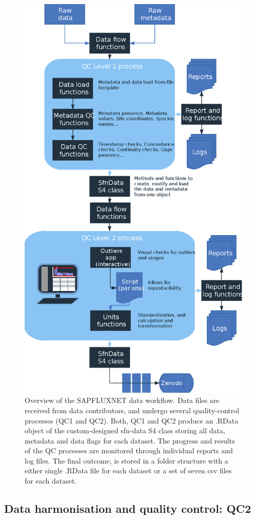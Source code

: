 \documentclass[11pt,twoside]{reedthesis}
\begin{document}
\setlength{\abovecaptionskip}{0pt}
\begin{figure}[H]

{\centering \includegraphics[width=0.7\linewidth]{figure/CH3/Figure1} 

}

\caption[Overview of the SAPFLUXNET data workflow.]{Overview of the SAPFLUXNET data workflow. Data files are received from data contributors, and undergo several quality-control processes (QC1 and QC2). Both, QC1 and QC2 produce an .RData object of the custom-designed sfn-data S4 class storing all data, metadata and data flags for each dataset. The progress and results of the QC processes are monitored through individual reports and log files. The final outcome, is stored in a folder structure with a either single .RData file for each dataset or a set of seven csv files for each dataset.}\label{fig:Ch2plot1}
\end{figure}
\subsection{Data harmonisation and quality control:
QC2}\label{data-harmonisation-and-quality-control-qc2}
\end{document}
